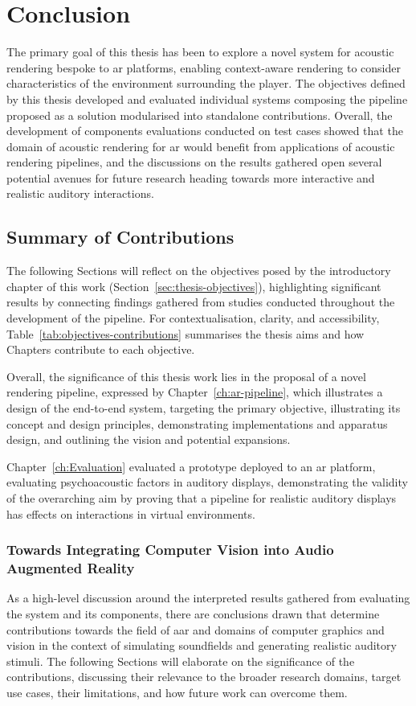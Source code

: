 \chapter{Conclusion}\label{ch:Conclusion}
The primary goal of this thesis has been to explore a novel system for acoustic rendering bespoke to \acrshort{ar} platforms, enabling context-aware rendering to consider characteristics of the environment surrounding the player. The objectives defined by this thesis developed and evaluated individual systems composing the pipeline proposed as a solution modularised into standalone contributions. Overall, the development of components evaluations conducted on test cases showed that the domain of acoustic rendering for \acrshort{ar} would benefit from applications of acoustic rendering pipelines, and the discussions on the results gathered open several potential avenues for future research heading towards more interactive and realistic auditory interactions.

\section{Summary of Contributions}
The following Sections will reflect on the objectives posed by the introductory chapter of this work (Section~\ref{sec:thesis-objectives}), highlighting significant results by connecting findings gathered from studies conducted throughout the development of the pipeline. For contextualisation, clarity, and accessibility, Table~\ref{tab:objectives-contributions} summarises the thesis aims and how Chapters contribute to each objective.


Overall, the significance of this thesis work lies in the proposal of a novel rendering pipeline, expressed by Chapter~\ref{ch:ar-pipeline}, which illustrates a design of the end-to-end system, targeting the primary objective, illustrating its concept and design principles, demonstrating implementations and apparatus design, and outlining the vision and potential expansions.\par
Chapter~\ref{ch:Evaluation} evaluated a prototype deployed to an \acrshort{ar} platform, evaluating psychoacoustic factors in auditory displays, demonstrating the validity of the overarching aim by proving that a pipeline for realistic auditory displays has effects on interactions in virtual environments.\par


\subsection{Towards Integrating Computer Vision into Audio Augmented Reality}
As a high-level discussion around the interpreted results gathered from evaluating the system and its components, there are conclusions drawn that determine contributions towards the field of \acrfull{aar} and domains of computer graphics and vision in the context of simulating soundfields and generating realistic auditory stimuli. The following Sections will elaborate on the significance of the contributions, discussing their relevance to the broader research domains, target use cases, their limitations, and how future work can overcome them.

